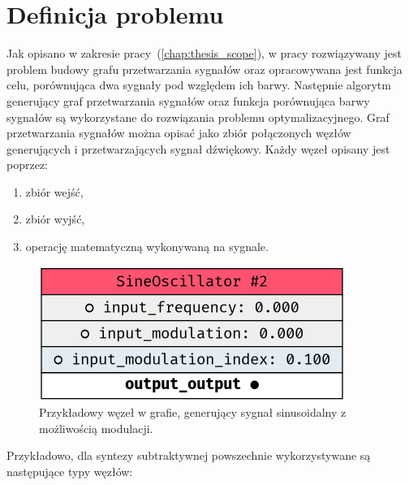 \chapter{Definicja problemu}\label{chap:problem_definition}

Jak opisano w zakresie pracy~(\ref{chap:thesis_scope}), w pracy rozwiązywany jest problem
budowy grafu przetwarzania sygnałów oraz opracowywana jest funkcja celu, porównująca dwa
sygnały pod względem ich barwy. Następnie algorytm generujący graf przetwarzania
sygnałów oraz funkcja porównująca barwy sygnałów są wykorzystane do rozwiązania
problemu optymalizacyjnego. 
Graf przetwarzania sygnałów można opisać jako zbiór połączonych węzłów generujących
i przetwarzających sygnał dźwiękowy. Każdy węzeł opisany jest poprzez:

\begin{multicols}{2}
\begin{enumerate}
  \item zbiór wejść,
  \item zbiór wyjść,
  \item operację matematyczną wykonywaną na sygnale.
\end{enumerate}


\begin{figure}[H]
  \centering
  \includegraphics{rys05/example_sine_node.png}
  \caption{Przykładowy węzeł w grafie, generujący sygnał sinusoidalny z możliwością modulacji.}
\end{figure}

\end{multicols}

\noindent
Przykładowo, dla syntezy subtraktywnej powszechnie wykorzystywane są następujące typy węzłów:

